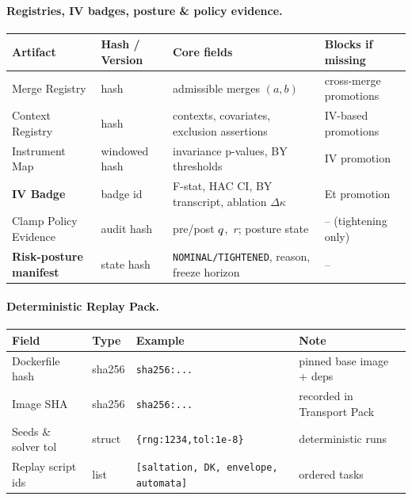 \paragraph{Registries, IV badges, posture \& policy evidence.}
\begin{center}
\renewcommand{\arraystretch}{1.12}
\begin{tabularx}{\textwidth}{@{} l l X X @{}}
\toprule
\textbf{Artifact} & \textbf{Hash / Version} & \textbf{Core fields} & \textbf{Blocks if missing} \\
\midrule
Merge Registry & hash & admissible merges $(a,b)$ & cross-merge promotions \\
Context Registry & hash & contexts, covariates, exclusion assertions & IV-based promotions \\
Instrument Map & windowed hash & invariance p-values, BY thresholds & IV promotion \\
\textbf{IV Badge} & badge id & F-stat, HAC CI, BY transcript, ablation $\Delta\kappa$ & Et promotion \\
Clamp Policy Evidence & audit hash & pre/post $q$,\ $r$; posture state & – (tightening only) \\
\textbf{Risk-posture manifest} & state hash & \texttt{NOMINAL/TIGHTENED}, reason, freeze horizon & – \\
\bottomrule
\end{tabularx}
\end{center}

\paragraph{Deterministic Replay Pack.}
\begin{center}
\renewcommand{\arraystretch}{1.12}
\begin{tabularx}{\textwidth}{@{} l l X X @{}}
\toprule
\textbf{Field} & \textbf{Type} & \textbf{Example} & \textbf{Note} \\
\midrule
Dockerfile hash & sha256 & \texttt{sha256:...} & pinned base image + deps \\
Image SHA & sha256 & \texttt{sha256:...} & recorded in Transport Pack \\
Seeds \& solver tol & struct & \texttt{\{rng:1234,tol:1e-8\}} & deterministic runs \\
Replay script ids & list & \texttt{[saltation, DK, envelope, automata]} & ordered tasks \\
\bottomrule
\end{tabularx}
\end{center}

